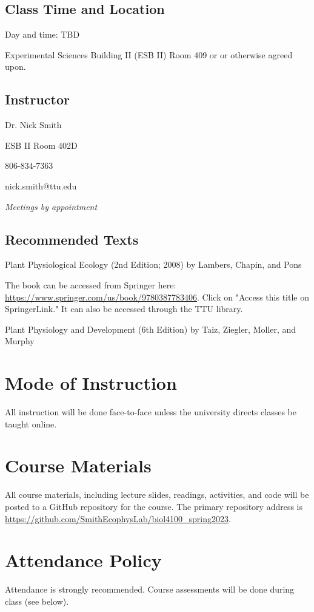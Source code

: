 \documentclass[12pt, notitlepage]{article}   	%
\begin{document}
{\subsection{Class Time and Location}
Day and time: TBD

Experimental Sciences Building II (ESB II) Room 409 or 
or otherwise agreed upon.

\subsection{Instructor}
Dr. Nick Smith \par
ESB II Room 402D \par
806-834-7363 \par
nick.smith@ttu.edu \par
\textit{Meetings by appointment}

\subsection{Recommended Texts}
Plant Physiological Ecology (2nd Edition; 2008) by Lambers, Chapin, and Pons \par
The book can be accessed from Springer here: 
\url{https://www.springer.com/us/book/9780387783406}. Click on "Access this title on 
SpringerLink." It can also be accessed through the TTU library. \par
Plant Physiology and Development (6th Edition) by Taiz, Ziegler, Moller, and Murphy

\section{Mode of Instruction}
All instruction will be done face-to-face unless the university directs classes be 
taught online.

\section{Course Materials}
All course materials, including lecture slides, readings, activities, and code 
will be posted to a GitHub repository for the course.
The primary repository address is
\url{https://github.com/SmithEcophysLab/biol4100_spring2023}.

\section{Attendance Policy}
Attendance is strongly recommended. 
Course assessments will be done during class (see below).

}
\end{document}

